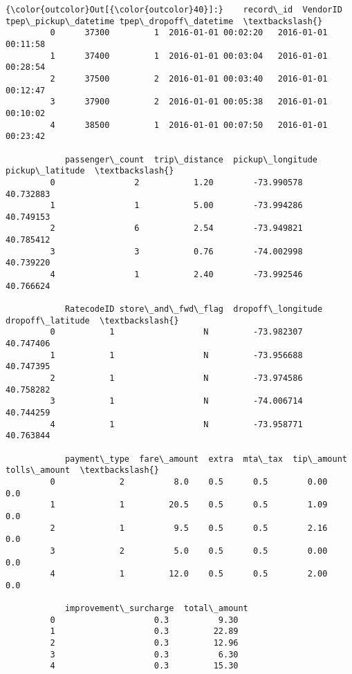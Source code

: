 \documentclass[11pt]{article}
\begin{document}
\begin{Verbatim}[commandchars=\\\{\}]
{\color{outcolor}Out[{\color{outcolor}40}]:}    record\_id  VendorID tpep\_pickup\_datetime tpep\_dropoff\_datetime  \textbackslash{}
         0      37300         1  2016-01-01 00:02:20   2016-01-01 00:11:58   
         1      37400         1  2016-01-01 00:03:04   2016-01-01 00:28:54   
         2      37500         2  2016-01-01 00:03:40   2016-01-01 00:12:47   
         3      37900         2  2016-01-01 00:05:38   2016-01-01 00:10:02   
         4      38500         1  2016-01-01 00:07:50   2016-01-01 00:23:42   
         
            passenger\_count  trip\_distance  pickup\_longitude  pickup\_latitude  \textbackslash{}
         0                2           1.20        -73.990578        40.732883   
         1                1           5.00        -73.994286        40.749153   
         2                6           2.54        -73.949821        40.785412   
         3                3           0.76        -74.002998        40.739220   
         4                1           2.40        -73.992546        40.766624   
         
            RatecodeID store\_and\_fwd\_flag  dropoff\_longitude  dropoff\_latitude  \textbackslash{}
         0           1                  N         -73.982307         40.747406   
         1           1                  N         -73.956688         40.747395   
         2           1                  N         -73.974586         40.758282   
         3           1                  N         -74.006714         40.744259   
         4           1                  N         -73.958771         40.763844   
         
            payment\_type  fare\_amount  extra  mta\_tax  tip\_amount  tolls\_amount  \textbackslash{}
         0             2          8.0    0.5      0.5        0.00           0.0   
         1             1         20.5    0.5      0.5        1.09           0.0   
         2             1          9.5    0.5      0.5        2.16           0.0   
         3             2          5.0    0.5      0.5        0.00           0.0   
         4             1         12.0    0.5      0.5        2.00           0.0   
         
            improvement\_surcharge  total\_amount  
         0                    0.3          9.30  
         1                    0.3         22.89  
         2                    0.3         12.96  
         3                    0.3          6.30  
         4                    0.3         15.30  
\end{Verbatim}
            
\end{document}
